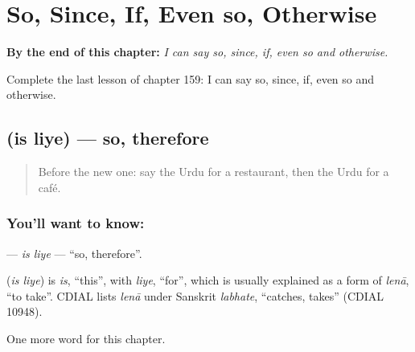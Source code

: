 
\chapter{So, Since, If, Even so, Otherwise}
\label{ch:ur-so-since-if-even-so-otherwise}

\begin{chapteropening}
\textbf{By the end of this chapter:} \emph{I can say so, since, if, even so and otherwise.}

Complete the last lesson of chapter 159: I can say so, since, if, even so and otherwise.
\end{chapteropening}

\section[\texorpdfstring{\ur{اس} \ur{لیے} (is liye)}{اس لیے (is liye)}]{  (is liye) — so, therefore}

\label{lesson:UR-C159-is-liye}



\begin{quote}
Before the new one: say the Urdu for a restaurant, then the Urdu for a café.
\end{quote}

\subsection*{You'll want to know:  }
\textbf{ } — \emph{is liye} — \textquotedblleft{}so, therefore\textquotedblright{}.

\begin{cousinweb}
\textbf{ } (\emph{is liye}) is \emph{is}, \textquotedblleft{}this\textquotedblright{}, with \emph{liye}, \textquotedblleft{}for\textquotedblright{}, which is usually explained as a form of \emph{lenā}, \textquotedblleft{}to take\textquotedblright{}. CDIAL lists \emph{lenā} under Sanskrit \emph{labhate}, \textquotedblleft{}catches, takes\textquotedblright{} (CDIAL 10948).
\end{cousinweb}

\begin{grammarlens}[title={What you've built}]
One more word for this chapter.
\end{grammarlens}

